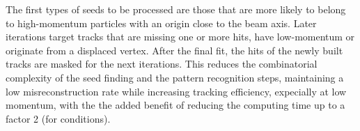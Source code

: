 The first types of seeds to be processed are those that are more likely to belong to high-momentum particles with an origin close to the beam axis.
Later iterations target tracks that are missing one or more hits, have low-momentum or originate from a displaced vertex.
After the final fit, the hits of the newly built tracks are masked for the next iterations.
This reduces the combinatorial complexity of the seed finding and the pattern recognition steps,
maintaining a low misreconstruction rate while increasing tracking efficiency, expecially at low momentum,
with the the added benefit of reducing the computing time up to a factor 2 (for \RunII{} conditions).
